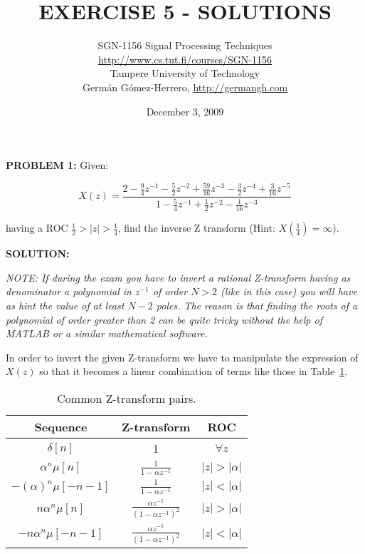 \documentclass[a4paper,11pt,oneside]{article}
\title{\large{\textbf{EXERCISE 5 - SOLUTIONS}}}
\author{SGN-1156 Signal Processing Techniques\\
\url{http://www.cs.tut.fi/courses/SGN-1156}\\
Tampere University of Technology\\
Germ\'an G\'omez-Herrero, \url{http://germangh.com}}
\date{December 3, 2009}
\begin{document}
\maketitle






\noindent \textbf{PROBLEM 1:} Given:

\[ 
X(z)=\frac{2-\frac{9}{4}z^{-1}-\frac{5}{2}z^{-2}+\frac{59}{16}z^{-3}-\frac{3}{2}z^{-4}+\frac{3}{16}z^{-5}}{1-\frac{5}{4}z^{-1}+\frac{1}{2}z^{-2}-\frac{1}{16}z^{-3}}
\]

having a ROC $\frac{1}{2}>|z|>\frac{1}{4}$, find the inverse Z transform (Hint: $X(\frac{1}{4})=\infty$).

\vspace{1cm}


\textbf{SOLUTION:}

\emph{NOTE: If during the exam you have to invert a rational Z-transform having as denominator a polynomial in $z^{-1}$ of order $N>2$ (like in this case) you will have as hint the value of at least $N-2$ poles. The reason is that finding the roots of a polynomial of order greater than 2 can be quite tricky without the help of MATLAB or a similar mathematical software.}

In order to invert the given Z-transform we have to manipulate the expression of $X(z)$ so that it becomes a linear combination of terms like those in Table~\ref{commonz}.

\begin{table}
\centering
\begin{tabular}{ccc}
\hline
Sequence & Z-transform & ROC\\
\hline
$\delta[n]$ & 1 & $\forall z$\vspace{.2cm}\\
$\alpha^n\mu[n]$ &  $\frac{1}{1-\alpha z^{-1}}$ & $|z|>|\alpha|$\vspace{.2cm}\\
$-(\alpha)^{n}\mu[-n-1]$ & $\frac{1}{1-\alpha z^{-1}}$ & $|z|<|\alpha|$\vspace{.2cm}\\
$n \alpha^n \mu[n]$ & $\frac{\alpha z^{-1}}{(1-\alpha z^{-1})^2}$ & $|z|>|\alpha|$\vspace{.2cm}\\
$-n\alpha^n \mu[-n-1]$ & $\frac{\alpha z^{-1}}{(1-\alpha z^{-1})^2}$ & $|z|<|\alpha|$\vspace{.2cm}\\
\hline
\end{tabular}
\caption{Common Z-transform pairs.}
\label{commonz}
\end{table}
\end{document}
